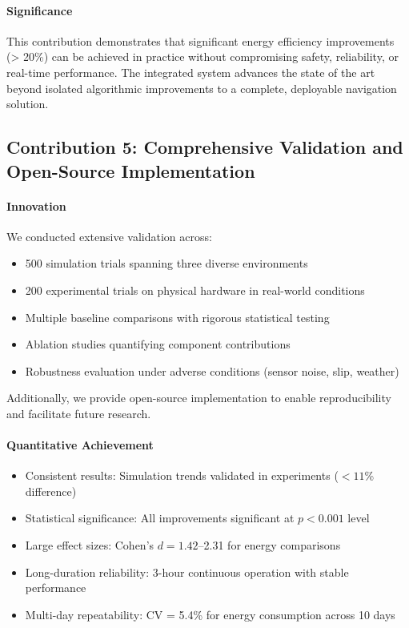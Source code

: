 \paragraph{Significance}
This contribution demonstrates that significant energy efficiency improvements (> 20\%) can be achieved in practice without compromising safety, reliability, or real-time performance. The integrated system advances the state of the art beyond isolated algorithmic improvements to a complete, deployable navigation solution.

\subsection{Contribution 5: Comprehensive Validation and Open-Source Implementation}

\paragraph{Innovation}
We conducted extensive validation across:
\begin{itemize}
    \item 500 simulation trials spanning three diverse environments
    \item 200 experimental trials on physical hardware in real-world conditions
    \item Multiple baseline comparisons with rigorous statistical testing
    \item Ablation studies quantifying component contributions
    \item Robustness evaluation under adverse conditions (sensor noise, slip, weather)
\end{itemize}

Additionally, we provide open-source implementation to enable reproducibility and facilitate future research.

\paragraph{Quantitative Achievement}
\begin{itemize}
    \item Consistent results: Simulation trends validated in experiments ($< 11$\% difference)
    \item Statistical significance: All improvements significant at $p < 0.001$ level
    \item Large effect sizes: Cohen's $d = 1.42$--2.31 for energy comparisons
    \item Long-duration reliability: 3-hour continuous operation with stable performance
    \item Multi-day repeatability: CV = 5.4\% for energy consumption across 10 days
\end{itemize}

